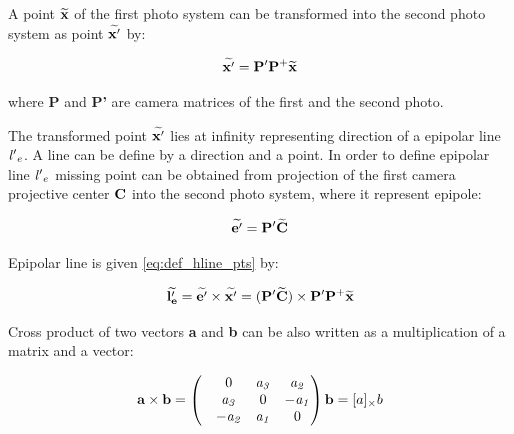 \documentclass[a4paper,12pt]{article}
\newcommand{\ematr}[1]{
{\bf #1}
}
\newcommand{\evect}[1]{
{\bf #1}
}
\newcommand{\ehvect}[1]{
{\bf \widetilde{#1}}
}
\newcommand{\escal}[1]{
{\it #1}
}
\begin{document}
A point $\ehvect{x}$ of the  first photo system  
can be transformed into  
 the second photo system as point $\ehvect{x'}$
by:

\begin{equation}
\ehvect{x'} =  \ematr{P'}\ematr{P}^{+}\ehvect{x}
\end{equation}

where \ematr{P} and \ematr{P'} are camera matrices of the first and the second photo.

The transformed point $\ehvect{x'}$ lies at infinity 
representing direction of a epipolar line $\escal{l'}_{e}$. A line can be define by a direction 
and a point. In order to define epipolar line $\escal{l'}_{e}$ missing point can be obtained from 
projection of the first camera projective center $\evect{C}$ into the second photo system, where it represent
epipole:

\begin{equation}
\ehvect{e'} =  \ematr{P'}\ehvect{C} \\
\end{equation}





Epipolar line is given \eqref{eq:def_hline_pts} by:

\begin{equation}
\ehvect{l'_{e}} =  \ehvect{e'} \times \ehvect{x'} = (\ematr{P'}\ehvect{C}) \times \ematr{P'}\ematr{P}^{+}\ehvect{x}
\end{equation}

Cross product of two vectors \evect{a} and \evect{b} can be also written as a multiplication of a matrix and a vector:

\begin{equation}
\evect{a}  \times \evect{b}  = 
\begin{pmatrix}
   & 0      & \escal{a_{3}}   & \escal{a_{2}}\\
   & \escal{a_{3}}  & 0               & \escal{-a_{1}}\\
   & \escal{-a_{2}} & \escal{a_{1}}   & 0\\
\end{pmatrix}
\evect{b} = [a]_{\times} b
\end{equation}
\end{document}
